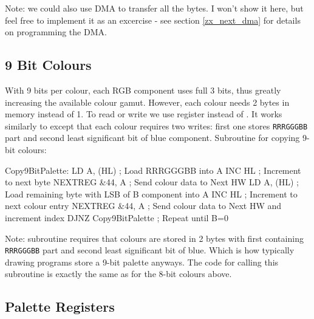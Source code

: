 Note: we could also use DMA to transfer all the bytes. I won't show it here, but feel free to implement it as an excercise - see section \ref{zx_next_dma} for details on programming the DMA.


\subsection{9 Bit Colours}

With 9 bits per colour, each RGB component uses full 3 bits, thus greatly increasing the available colour gamut. However, each colour needs 2 bytes in memory instead of 1. To read or write we use  register instead of . It works similarly to  except that each colour requires two writes: first one stores {\tt RRRGGGBB} part and second least significant bit of blue component. Subroutine for copying 9-bit colours:

\begin{tcblisting}{}
Copy9BitPalette:
	LD A, (HL)                ; Load RRRGGGBB into A
	INC HL                    ; Increment to next byte
	NEXTREG &44, A            ; Send colour data to Next HW
	LD A, (HL)                ; Load remaining byte with LSB of B component into A
	INC HL                    ; Increment to next colour entry
	NEXTREG &44, A            ; Send colour data to Next HW and increment index
	DJNZ Copy9BitPalette      ; Repeat until B=0
\end{tcblisting}

Note: subroutine requires that colours are stored in 2 bytes with first containing {\tt RRRGGGBB} part and second least significant bit of blue. Which is how typically drawing programs store a 9-bit palette anyways. The code for calling this subroutine is exactly the same as for the 8-bit colours above.


\subsection{Palette Registers}
\label{zx_next_palette_registers}

\subsubsection{}

\begin{NextPort}
\end{NextPort}


